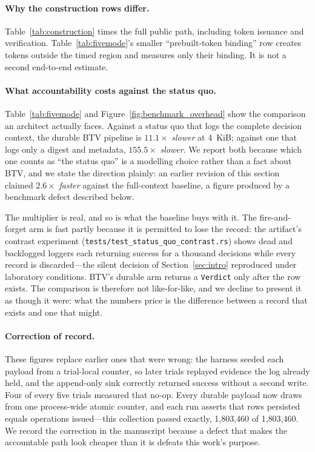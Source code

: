 \paragraph*{Why the construction rows differ.}
Table~\ref{tab:construction} times the full public path, including token
issuance and verification.  Table~\ref{tab:fivemode}'s smaller
``prebuilt-token binding'' row creates tokens outside the timed region and
measures only their binding.  It is not a second end-to-end estimate.

\paragraph*{What accountability costs against the status quo.}
Table~\ref{tab:fivemode} and Figure~\ref{fig:benchmark_overhead} show
the comparison an architect actually faces.
Against a status quo that logs the complete decision context, the durable
BTV pipeline is $11.1\times$ \emph{slower} at 4~KiB; against one that logs
only a digest and metadata, $155.5\times$ \emph{slower}.  We report both
because which one counts as ``the status quo'' is a modelling choice
rather than a fact about BTV, and we state the direction plainly: an
earlier revision of this section claimed $2.6\times$ \emph{faster} against
the full-context baseline, a figure produced by a benchmark defect
described below.

The multiplier is real, and so is what the baseline buys with it.
The fire-and-forget arm is fast partly because it is permitted to
lose the record: the artifact's contrast experiment
(\texttt{tests/test\_status\_quo\_contrast.rs}) shows dead and
backlogged loggers each returning success for a thousand decisions
while every record is discarded---the silent decision of
Section~\ref{sec:intro} reproduced under laboratory conditions.
BTV's durable arm returns a \texttt{Verdict} only after the row
exists.  The comparison is therefore not like-for-like, and we decline
to present it as though it were: what the numbers price is the
difference between a record that exists and one that might.

\paragraph*{Correction of record.}
These figures replace earlier ones that were wrong: the harness seeded
each payload from a trial-local counter, so later trials replayed evidence
the log already held, and the append-only sink correctly returned success
without a second write.  Four of every five trials measured that no-op.
Every durable payload now draws from one process-wide atomic counter, and
each run asserts that rows persisted equals operations issued---this
collection passed exactly, 1{,}803{,}460 of 1{,}803{,}460.  We record the
correction in the manuscript because a defect that makes the accountable
path look cheaper than it is defeats this work's purpose.

